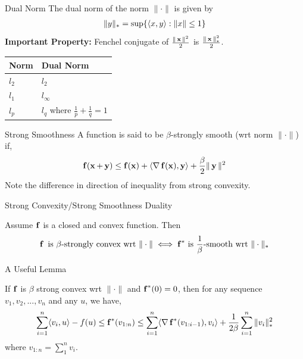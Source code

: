 \begin{frame}{Dual Norm}
  The dual norm of the norm $\| \cdot \|$ is given by
  \begin{align*}
    \|y\|_{*} = \sup\{\langle {x} , {y} \rangle : \|x\| \le 1\}
  \end{align*}
      {\bf Important Property:} Fenchel conjugate of $\frac{\|\operatorname{\mathbf{x}}\|^2}{2}$ is $\frac{\|\operatorname{\mathbf{x}}\|_{*}^2}{2}$.
      \begin{center}
        \begin{tabular}{ll}
          Norm & Dual Norm\\
          \hline
          $l_2$ & $l_2$\\
          $l_1$ & $l_{\infty}$\\
          $l_p$ & $l_q$ where $\frac{1}{p}+\frac{1}{q}=1$\\
        \end{tabular}
      \end{center}
\end{frame}

\begin{frame}{Strong Smoothness}
  A function is said to be $\beta$-strongly smooth (wrt norm $\| \cdot \|$) if,
  \begin{align*}
    \operatorname{\mathbf{f}}(\operatorname{\mathbf{x}}+\operatorname{\mathbf{y}}) \le \operatorname{\mathbf{f}}(\operatorname{\mathbf{x}}) + \langle {\operatorname{\nabla}\operatorname{\mathbf{f}}(\operatorname{\mathbf{x}})} , {\operatorname{\mathbf{y}}} \rangle +\frac{\beta}{2} \|\operatorname{\mathbf{y}}\|^2
  \end{align*}
  Note the difference in direction of inequality from strong convexity.
\end{frame}

\begin{frame}{Strong Convexity/Strong Smoothness Duality}
  \begin{theorem}[6]
    Assume $\operatorname{\mathbf{f}}$ is a closed and convex function. Then
    \begin{align*}
      \operatorname{\mathbf{f}} \text{ is } \beta\text{-strongly convex wrt }  \| \cdot \| \iff {\operatorname{\mathbf{f}}}^{*} \text{ is } \frac{1}{\beta}\text{-smooth wrt }  \| \cdot \|_{*}
    \end{align*}
  \end{theorem}
\end{frame}

\begin{frame}{A Useful Lemma}
  \begin{lemma}
    If $\operatorname{\mathbf{f}}$ is $\beta$ strong convex wrt $\|\cdot\|$ and ${\operatorname{\mathbf{f}}}^{*}(0)=0$, then for any sequence $v_1,v_2,...,v_n$ and any $u$, we have,
    \begin{align*}
      \sum_{i=1}^n \langle {v_i} , {u} \rangle - f(u) \le {\operatorname{\mathbf{f}}}^{*}(v_{1:n}) \le \sum_{i=1}^n \langle {\operatorname{\nabla}{\operatorname{\mathbf{f}}}^{*}(v_{1:i-1})} , {v_i} \rangle +\frac{1}{2\beta} \sum_{i=1}^n \|v_i\|_{*}^2
    \end{align*}
    where $v_{1:n}=\sum_1^n v_i$.
  \end{lemma}
\end{frame}

